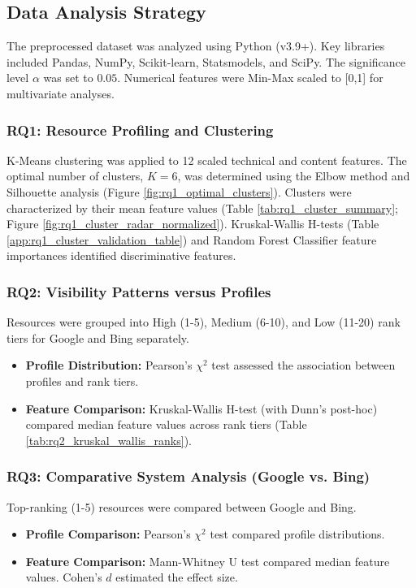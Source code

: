 \documentclass[a4paper,fleqn]{cas-sc}
\begin{document}
\subsection{Data Analysis Strategy}
\label{subsec:analysis_strategy}
The preprocessed dataset was analyzed using Python (v3.9+). Key libraries included Pandas, NumPy, Scikit-learn, Statsmodels, and SciPy. The significance level $\alpha$ was set to $0.05$. Numerical features were Min-Max scaled to [0,1] for multivariate analyses.

\subsubsection{RQ1: Resource Profiling and Clustering}
\label{subsubsec:analysis_rq1}
K-Means clustering was applied to 12 scaled technical and content features. The optimal number of clusters, $K=6$, was determined using the Elbow method and Silhouette analysis (Figure \ref{fig:rq1_optimal_clusters}). Clusters were characterized by their mean feature values (Table \ref{tab:rq1_cluster_summary}; Figure \ref{fig:rq1_cluster_radar_normalized}). Kruskal-Wallis H-tests (Table \ref{app:rq1_cluster_validation_table}) and Random Forest Classifier feature importances identified discriminative features.

\subsubsection{RQ2: Visibility Patterns versus Profiles}
\label{subsubsec:analysis_rq2}
Resources were grouped into High (1-5), Medium (6-10), and Low (11-20) rank tiers for Google and Bing separately.
\begin{itemize}
\item \textbf{Profile Distribution:} Pearson's $\chi^2$ test assessed the association between profiles and rank tiers.
\item \textbf{Feature Comparison:} Kruskal-Wallis H-test (with Dunn's post-hoc) compared median feature values across rank tiers (Table \ref{tab:rq2_kruskal_wallis_ranks}).
\end{itemize}

\subsubsection{RQ3: Comparative System Analysis (Google vs. Bing)}
\label{subsubsec:analysis_rq3}
Top-ranking (1-5) resources were compared between Google and Bing.
\begin{itemize}
\item \textbf{Profile Comparison:} Pearson's $\chi^2$ test compared profile distributions.
\item \textbf{Feature Comparison:} Mann-Whitney U test compared median feature values. Cohen's $d$ estimated the effect size.
\end{itemize}
\end{document}
